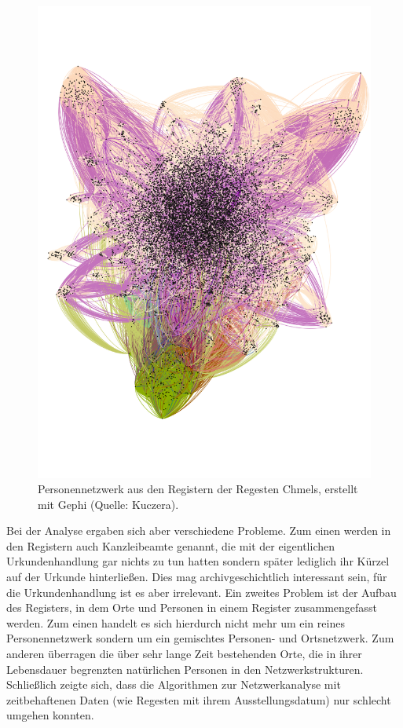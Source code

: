 \documentclass[ngerman,]{scrreprt}
\begin{document}
\begin{figure}
\centering
\includegraphics{Bilder/Chmelvisualisierung-v2.png}
\caption{Personennetzwerk aus den Registern der Regesten Chmels, erstellt mit Gephi (Quelle: Kuczera).}
\label{chmelvisualisierung}
\end{figure}

Bei der Analyse ergaben sich aber verschiedene Probleme. Zum einen werden in den Registern auch Kanzleibeamte genannt, die mit der eigentlichen Urkundenhandlung gar nichts zu tun hatten sondern später lediglich ihr Kürzel auf der Urkunde hinterließen. Dies mag archivgeschichtlich interessant sein, für die Urkundenhandlung ist es aber irrelevant. Ein zweites Problem ist der Aufbau des Registers, in dem Orte und Personen in einem Register zusammengefasst werden. Zum einen handelt es sich hierdurch nicht mehr um ein reines Personennetzwerk sondern um ein gemischtes Personen- und Ortsnetzwerk. Zum anderen überragen die über sehr lange Zeit bestehenden Orte, die in ihrer Lebensdauer begrenzten natürlichen Personen in den Netzwerkstrukturen. Schließlich zeigte sich, dass die Algorithmen zur Netzwerkanalyse mit zeitbehaftenen Daten (wie Regesten mit ihrem Ausstellungsdatum) nur schlecht umgehen konnten.
\end{document}
